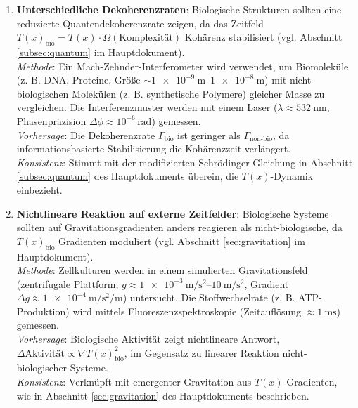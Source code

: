 \documentclass[12pt,a4paper]{article}
\newcommand{\Tfield}{T(x)}
\begin{document}
	\begin{enumerate}
		\item \textbf{Unterschiedliche Dekoherenzraten}: Biologische Strukturen sollten eine reduzierte Quantendekoherenzrate zeigen, da das Zeitfeld $\Tfield_{\text{bio}} = \Tfield \cdot \Omega(\text{Komplexität})$ Kohärenz stabilisiert (vgl. Abschnitt \ref{subsec:quantum} im Hauptdokument). \\
		\textit{Methode}: Ein Mach-Zehnder-Interferometer wird verwendet, um Biomoleküle (z. B. DNA, Proteine, Größe $\sim \SIrange{1e-9}{1e-8}{\meter}$) mit nicht-biologischen Molekülen (z. B. synthetische Polymere) gleicher Masse zu vergleichen. Die Interferenzmuster werden mit einem Laser ($\lambda \approx \SI{532}{\nano\meter}$, Phasenpräzision $\Delta\phi \approx 10^{-6} \, \text{rad}$) gemessen. \\
		\textit{Vorhersage}: Die Dekoherenzrate $\Gamma_{\text{bio}}$ ist geringer als $\Gamma_{\text{non-bio}}$, da informationsbasierte Stabilisierung die Kohärenzzeit verlängert. \\
		\textit{Konsistenz}: Stimmt mit der modifizierten Schrödinger-Gleichung in Abschnitt \ref{subsec:quantum} des Hauptdokuments überein, die $\Tfield$-Dynamik einbezieht.
		
		\item \textbf{Nichtlineare Reaktion auf externe Zeitfelder}: Biologische Systeme sollten auf Gravitationsgradienten anders reagieren als nicht-biologische, da $\Tfield_{\text{bio}}$ Gradienten moduliert (vgl. Abschnitt \ref{sec:gravitation} im Hauptdokument). \\
		\textit{Methode}: Zellkulturen werden in einem simulierten Gravitationsfeld (zentrifugale Plattform, $g \approx \SIrange{1e-3}{10}{\meter\per\second\squared}$, Gradient $\Delta g \approx \SI{1e-4}{\meter\per\second\squared\per\meter}$) untersucht. Die Stoffwechselrate (z. B. ATP-Produktion) wird mittels Fluoreszenzspektroskopie (Zeitauflösung $\approx \SI{1}{\milli\second}$) gemessen. \\
		\textit{Vorhersage}: Biologische Aktivität zeigt nichtlineare Antwort, $\Delta \text{Aktivität} \propto \nabla \Tfield_{\text{bio}}^2$, im Gegensatz zu linearer Reaktion nicht-biologischer Systeme. \\
		\textit{Konsistenz}: Verknüpft mit emergenter Gravitation aus $\Tfield$-Gradienten, wie in Abschnitt \ref{sec:gravitation} des Hauptdokuments beschrieben.
		

\end{enumerate}
\end{document}
